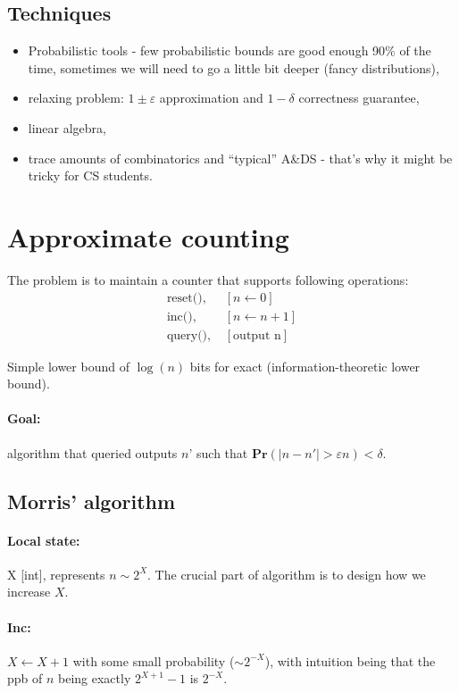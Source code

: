 \documentclass[11pt]{article}
\newcommand{\Ppb}{\mathbf{Pr}}
\begin{document}
\subsection{Techniques}
\begin{itemize}
    \item Probabilistic tools  - few probabilistic bounds are good enough 90\% of the time, sometimes we will need to go a little bit deeper (fancy distributions),
    \item relaxing problem: $1\pm \varepsilon$ approximation and $1-\delta$ correctness guarantee,
    \item linear algebra,
    \item trace amounts of combinatorics and ``typical'' A\&DS - that's why it might be tricky for CS students.
\end{itemize}
\section{Approximate counting} 
The problem is to maintain a counter that supports following operations:
\begin{align*}
\text{reset(),  } &[n\leftarrow 0]\\
\text{inc(),    } &[n\leftarrow n+1]\\
\text{query(),  } &[\text{output n}]
\end{align*}

Simple lower bound of $\log(n)$ bits for exact (information-theoretic lower bound).

\paragraph{Goal:} algorithm that queried outputs $n’$ such that $\Ppb( |n-n'| > \varepsilon n ) < \delta$.
\subsection{Morris’ algorithm \cite{DBLP:journals/cacm/Morris78a}}
\paragraph{Local state:} X [int], represents $n \sim 2^X$. The crucial part of algorithm is to design how we increase $X$.

\paragraph{Inc: }$X \leftarrow X+1$ with some small probability ($\sim 2^{-X}$), with intuition being that the ppb of $n$ being exactly $2^{X+1}-1$ is $2^{-X}$.
\end{document}
